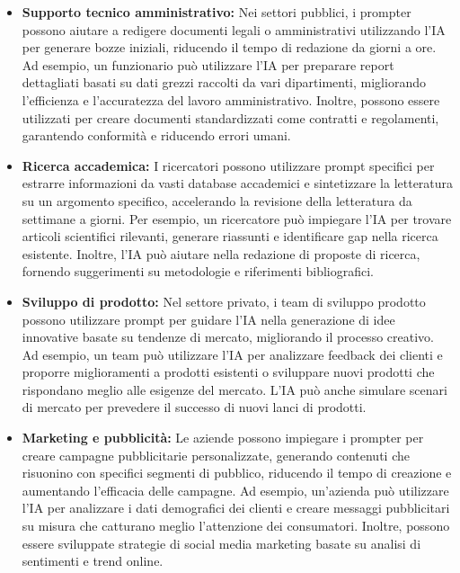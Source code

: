         \begin{itemize}
            \item \textbf{Supporto tecnico amministrativo:} Nei settori pubblici, i prompter possono aiutare a redigere documenti legali o amministrativi utilizzando l'IA per generare bozze iniziali, riducendo il tempo di redazione da giorni a ore. Ad esempio, un funzionario può utilizzare l'IA per preparare report dettagliati basati su dati grezzi raccolti da vari dipartimenti, migliorando l'efficienza e l'accuratezza del lavoro amministrativo. Inoltre, possono essere utilizzati per creare documenti standardizzati come contratti e regolamenti, garantendo conformità e riducendo errori umani. 
            
            \item \textbf{Ricerca accademica:} I ricercatori possono utilizzare prompt specifici per estrarre informazioni da vasti database accademici e sintetizzare la letteratura su un argomento specifico, accelerando la revisione della letteratura da settimane a giorni. Per esempio, un ricercatore può impiegare l'IA per trovare articoli scientifici rilevanti, generare riassunti e identificare gap nella ricerca esistente. Inoltre, l'IA può aiutare nella redazione di proposte di ricerca, fornendo suggerimenti su metodologie e riferimenti bibliografici. 
            
            \item \textbf{Sviluppo di prodotto:} Nel settore privato, i team di sviluppo prodotto possono utilizzare prompt per guidare l'IA nella generazione di idee innovative basate su tendenze di mercato, migliorando il processo creativo. Ad esempio, un team può utilizzare l'IA per analizzare feedback dei clienti e proporre miglioramenti a prodotti esistenti o sviluppare nuovi prodotti che rispondano meglio alle esigenze del mercato. L'IA può anche simulare scenari di mercato per prevedere il successo di nuovi lanci di prodotti. 
            
            \item \textbf{Marketing e pubblicità:} Le aziende possono impiegare i prompter per creare campagne pubblicitarie personalizzate, generando contenuti che risuonino con specifici segmenti di pubblico, riducendo il tempo di creazione e aumentando l'efficacia delle campagne. Ad esempio, un'azienda può utilizzare l'IA per analizzare i dati demografici dei clienti e creare messaggi pubblicitari su misura che catturano meglio l'attenzione dei consumatori. Inoltre, possono essere sviluppate strategie di social media marketing basate su analisi di sentimenti e trend online. 
            

\end{itemize}
